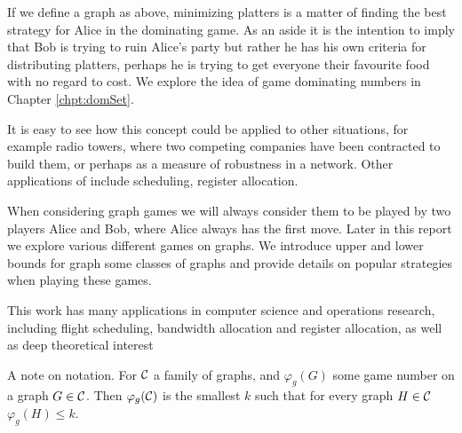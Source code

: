If we define a graph as above, minimizing platters is a matter of finding the best strategy for Alice in the dominating game. 
As an aside it is the intention to imply that Bob is trying to ruin Alice's party but rather he has his own criteria for distributing platters, perhaps he is trying to get everyone their favourite food with no regard to cost. We explore the idea of game dominating numbers in Chapter \ref{chpt:domSet}.

It is easy to see how this concept could be applied to other situations, for example radio towers, where two competing companies have been contracted to build them, or perhaps as a measure of robustness in a network. Other applications of include scheduling, register allocation.  

When considering graph games we will always consider them to be played by two players Alice and Bob, where Alice always has the first move. Later in this report we explore various different games on graphs. We introduce upper and lower bounds for graph some classes of graphs and provide details on popular strategies when playing these games.   




  
This work has many applications in computer science and operations research, including flight scheduling, bandwidth allocation and register allocation, as well as deep theoretical interest%
    
A note on notation. For $\mathcal{C}$ a family of graphs, and $\varphi_g(G)$ some game number on a graph $G \in \mathcal{C}$. Then $\varphi_g(\mathcal{C})$ is the smallest $k$ such that for every graph $H\in\mathcal{C}$ $\varphi_g(H)\leq k$.   

    
    
    
    
    
    
    
    
    
    
    
    
    
    
    
    
    
    
    
    
    